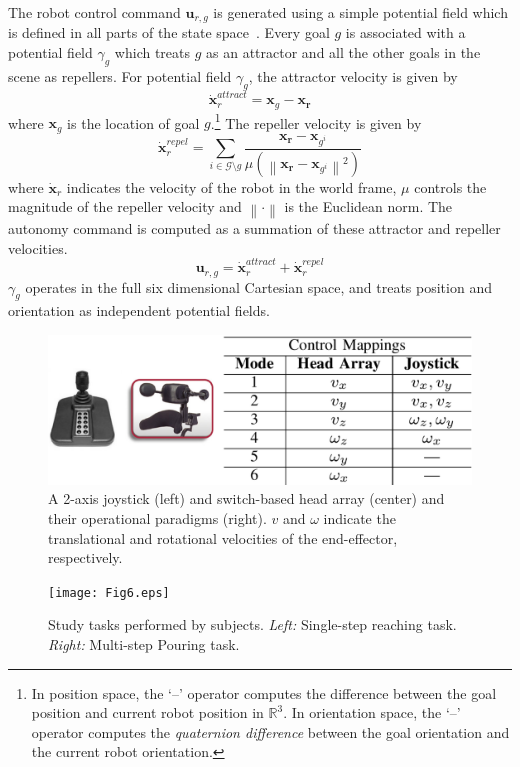 \documentclass[natbib, twocolumn]{svjour3}          %
\newcommand{\norm}[1]{\left\lVert#1\right\rVert}
\begin{document}
The robot control command $\boldsymbol{u}_{r,g}$ is generated using a simple potential field which is defined in all parts of the state space~\citep{khatib1986real}. Every goal $g$ is associated with a potential field $\gamma_g$ which treats $g$ as an attractor and all the other goals in the scene as repellers. For potential field $\gamma_g$, the attractor velocity is given by
\begin{equation*}
\dot{\boldsymbol{x}}_r^{attract} = \boldsymbol{x}_{g} - \boldsymbol{x_r}
\end{equation*}
where $\boldsymbol{x}_{g}$ is the location of goal $g$.\footnote{In position space, the `--' operator computes the difference between the goal position and current robot position in $\mathbb{R}^3$. In orientation space, the `--' operator computes the \textit{quaternion difference} between the goal orientation and the current robot orientation.} The repeller velocity is given by
\begin{equation*}
\dot{\boldsymbol{x}}_r^{repel} = \sum_{i \in \mathcal{G} \setminus g} \frac{\boldsymbol{x_r} - \boldsymbol{x}_{g^i}}{\mu(\norm{\boldsymbol{x_r} - \boldsymbol{x}_{g^i}}^2)}
\end{equation*}
where $\dot{\boldsymbol{x}}_r$ indicates the velocity of the robot in the world frame, $\mu$ controls the magnitude of the repeller velocity and $\norm{\cdot}$ is the Euclidean norm. The autonomy command is computed as a summation of these attractor and repeller velocities.
\begin{equation*}
\boldsymbol{u}_{r,g} = \dot{\boldsymbol{x}}_r^{attract} + \dot{\boldsymbol{x}}_r^{repel} 
\end{equation*}
$\gamma_g$ operates in the full six dimensional Cartesian space, and treats position and orientation as independent potential fields. 
\begin{figure}[b]
	\centering
	\includegraphics[width = 1\hsize, height = 0.14\vsize]{Fig5.eps}
	\caption{A 2-axis joystick (left) and switch-based head array (center) and their operational paradigms (right). $v$ and $\omega$ indicate the translational and rotational velocities of the end-effector, respectively.}
	\label{fig:interfaces}
\end{figure}
\begin{figure}[ht!]
	\texttt{[image: Fig6.eps]}
	\caption{Study tasks performed by subjects. \textit{Left:} Single-step reaching task. \textit{Right:} Multi-step Pouring task. }
	\label{fig:tasks}
\end{figure}
\end{document}
